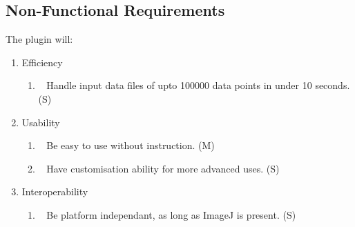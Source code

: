 \subsection{Non-Functional Requirements}
\label{sub:non_functional_requirements}

The plugin will:

\begin{enumerate}[label=\arabic*.]
	\item Efficiency
		\begin{enumerate}[label*=\arabic*.]
			\item~\label{req:o} Handle input data files of upto \num{100000}
				data points in under 10 seconds. (S)
		\end{enumerate}
	\item Usability
		\begin{enumerate}[label*=\arabic*.]
			\item~\label{req:p} Be easy to use without instruction. (M)
			\item~\label{req:q} Have customisation ability for more advanced
				uses. (S)
		\end{enumerate}
	\item Interoperability
		\begin{enumerate}[label*=\arabic*.]
			\item~\label{req:r} Be platform independant, as long as ImageJ is
				present. (S)
		\end{enumerate}
\end{enumerate}

\restoregeometry%
